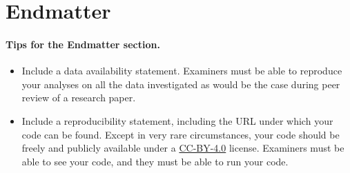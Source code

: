 \section{Endmatter} \label{sec:endmatter}

\paragraph{Tips for the Endmatter section.} 

\begin{itemize}
    \item Include a data availability statement. Examiners must be able to reproduce your analyses on all the data investigated as would be the case during peer review of a research paper.
    \item Include a reproducibility statement, including the URL under which your code can be found. Except in very rare circumstances, your code should be freely and publicly available under a \href{https://creativecommons.org/licenses/by/4.0/deed.en}{CC-BY-4.0} license. Examiners must be able to see your code, and they must be able to run your code.
\end{itemize}
